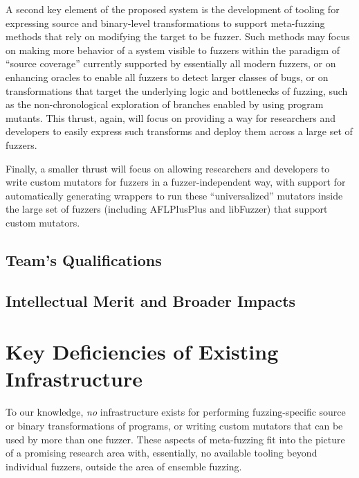 \documentclass[numbers]{proposalnsf}
\begin{document}
A second key element of the proposed system is the development of tooling for expressing source and binary-level transformations to support meta-fuzzing methods that rely on modifying the target to be fuzzer.  Such methods may focus on making more behavior of a system visible to fuzzers within the paradigm of ``source coverage'' currently supported by essentially all modern fuzzers, or on enhancing oracles to enable all fuzzers to detect larger classes of bugs, or on transformations that target the underlying logic and bottlenecks of fuzzing, such as the non-chronological exploration of branches enabled by using program mutants.  This thrust, again, will focus on providing a way for researchers and developers to easily express such transforms and deploy them across a large set of fuzzers.

Finally, a smaller thrust will focus on allowing researchers and developers to write custom mutators for fuzzers in a fuzzer-independent way, with support for automatically generating wrappers to run these ``universalized'' mutators inside the large set of fuzzers (including AFLPlusPlus and libFuzzer) that support custom mutators.


\subsection{Team's Qualifications}

\subsection{Intellectual Merit and Broader Impacts}

\section{Key Deficiencies of Existing Infrastructure}

To our knowledge, \emph{no} infrastructure exists for performing fuzzing-specific source or binary transformations of programs, or writing custom mutators that can be used by more than one fuzzer.  These aspects of meta-fuzzing fit into the picture of a promising research area with, essentially, no available tooling beyond individual fuzzers, outside the area of ensemble fuzzing.
\end{document}
